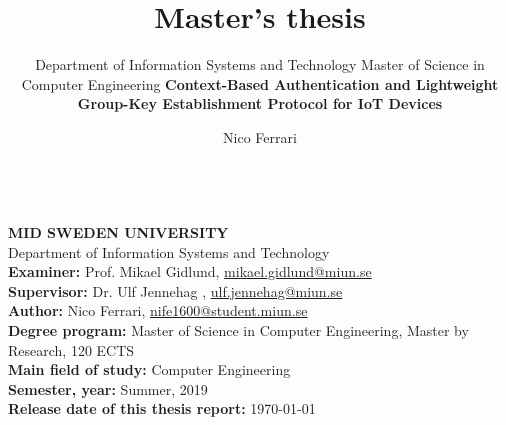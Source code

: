 \documentclass[a4paper,12pt,mst,final, oneside]{miunthes} %
\title{Master's thesis}
\subtitle{
    Department of Information Systems and Technology
    \newline
    \newline
    Master of Science in Computer Engineering
    \newline
    \newline
    \newline
    \newline
    \textbf{Context-Based Authentication and Lightweight Group-Key Establishment Protocol for IoT Devices}
    \newline
}
\author{Nico Ferrari}
\begin{document}
 	\begin{titlingpage}
 		\maketitle
 	\end{titlingpage}
	\frontmatter
	\noindent
	\vspace{\fill}\\
	\textbf{MID SWEDEN UNIVERSITY}\\
    Department of Information Systems and Technology\\
    \newline
    \textbf{Examiner:} Prof. Mikael Gidlund, \url{mikael.gidlund@miun.se}\\
    \textbf{Supervisor:} Dr. Ulf Jennehag , \url{ulf.jennehag@miun.se}\\
    \textbf{Author:} Nico Ferrari, \url{nife1600@student.miun.se}\\
    \newline
    \textbf{Degree program:} Master of Science in Computer Engineering, 
        \newline   Master by Research, 120 ECTS \\ 
    \textbf{Main field of study:} Computer Engineering\\
    \textbf{Semester, year:} Summer, 2019 \\
    \textbf{Release date of this thesis report:} \today
    
    
    \clearpage
    
    
	
	\clearpage
	
	
	\clearpage
	\tableofcontents
	\clearpage
	
	
	
	
	
	
	\mainmatter
	
	
	
    
    
    
    
%    
    
	
	
	
\end{document}
